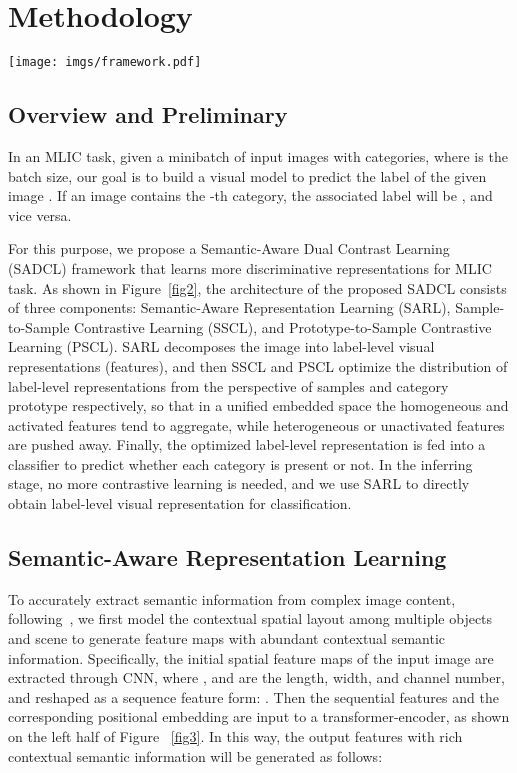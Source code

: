 \documentclass{ecai}
\begin{document}
\vspace{-0.1cm}
\section{Methodology}
\begin{figure*}[ht]
	\centering
	\texttt{[image: imgs/framework.pdf]}
	\caption{The overview of the SADCL framework. \textbf{Note that a solid square represents an active state, and a hollow square represents an inactive state}. Meanwhile, different colors represent different categories. () is a projection network.}
	
	\label{fig2}
\end{figure*}
\subsection{Overview and Preliminary}
In an MLIC task, given a minibatch of input images  with  categories, where  is the batch size, our goal is to build a visual model  to predict the label  of the given image . If an image  contains the -th category, the associated label  will be , and vice versa.

For this purpose, we propose a Semantic-Aware Dual Contrast Learning (SADCL) framework that learns more discriminative representations for MLIC task. As shown in Figure~\ref{fig2}, the architecture of the proposed SADCL consists of three components: Semantic-Aware Representation Learning (SARL), Sample-to-Sample Contrastive Learning (SSCL), and Prototype-to-Sample Contrastive Learning (PSCL). SARL decomposes the image into  label-level visual representations (features), and then SSCL and PSCL optimize the distribution of label-level representations from the perspective of samples and category prototype respectively, so that in a unified embedded space the homogeneous and activated features tend to aggregate, while heterogeneous or unactivated features are pushed away. Finally, the optimized label-level representation is fed into a classifier to predict whether each category is present or not. In the inferring stage, no more contrastive learning is needed, and we use SARL to directly obtain label-level visual representation for classification.

\subsection{Semantic-Aware Representation Learning}\label{SARL}
To accurately extract semantic information from complex image content, following~\cite{dao2021multi,liu2021q2l}, we first model the contextual spatial layout among multiple objects and scene to generate feature maps with abundant contextual semantic information. Specifically, the initial spatial feature maps  of the input image are extracted through CNN, where ,  and  are the length, width, and channel number, and reshaped as a sequence feature form: . Then the sequential features  and the corresponding positional embedding  are input to a transformer-encoder, as shown on the left half of Figure ~\ref{fig3}. In this way, the output features with rich contextual semantic information will be generated as follows:
\end{document}
